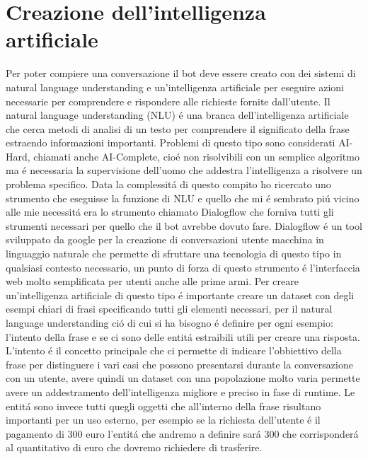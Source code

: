 \section{Creazione dell'intelligenza artificiale}

Per poter compiere una conversazione il bot deve essere creato con dei sistemi di natural language understanding e un'intelligenza artificiale per eseguire azioni necessarie per comprendere e rispondere alle richieste fornite dall'utente.
Il natural language understanding (NLU) \'e una branca dell'intelligenza artificiale che cerca metodi di analisi di un testo per comprendere il significato della frase estraendo informazioni importanti. Problemi di questo tipo sono considerati AI-Hard, chiamati anche AI-Complete, cio\'e non risolvibili con un semplice algoritmo ma \'e necessaria la supervisione dell'uomo che addestra l'intelligenza a risolvere un problema specifico.
Data la complessit\'a di questo compito ho ricercato uno strumento che eseguisse la funzione di NLU e quello che mi \'e sembrato pi\'u vicino alle mie necessit\'a era lo strumento chiamato Dialogflow che forniva tutti gli strumenti necessari per quello che il bot avrebbe dovuto fare.
Dialogflow \'e un tool sviluppato da google per la creazione di conversazioni utente macchina in linguaggio naturale che permette di sfruttare una tecnologia di questo tipo in qualsiasi contesto necessario, un punto di forza di questo strumento \'e l'interfaccia web molto semplificata per utenti anche alle prime armi.
Per creare un'intelligenza artificiale di questo tipo \'e importante creare un dataset con degli esempi chiari di frasi specificando tutti gli elementi necessari, per il natural language understanding ci\'o di cui si ha bisogno \'e definire per ogni esempio: l'intento della frase e se ci sono delle entit\'a estraibili utili per creare una risposta.
L'intento \'e il concetto principale che ci permette di indicare l'obbiettivo della frase per distinguere i vari casi che possono presentarsi durante la conversazione con un utente, avere quindi un dataset con una popolazione molto varia permette avere un addestramento dell'intelligenza migliore e preciso in fase di runtime.
Le entit\'a sono invece tutti quegli oggetti che all'interno della frase risultano importanti per un uso esterno, per esempio se la richiesta dell'utente \'e il pagamento di 300 euro l'entit\'a che andremo a definire sar\'a 300 che corrisponder\'a al quantitativo di euro che dovremo richiedere di trasferire.  
